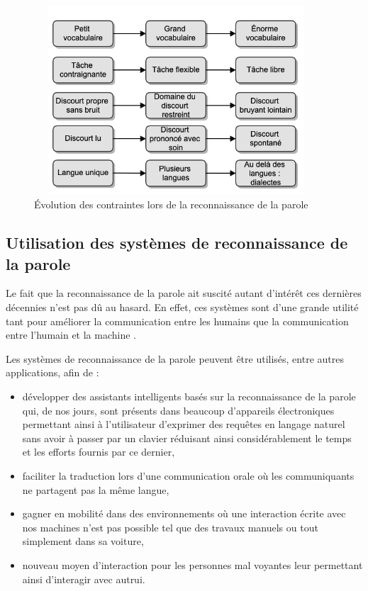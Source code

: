 \begin{figure}[H]
    \centering
    \includegraphics[height=200pt,width=300pt]{images/chap1/evolution_asr.png}
    \caption{Évolution des contraintes lors de la reconnaissance de la parole}
    \label{evolotion}
\end{figure}

\subsection{Utilisation des systèmes de reconnaissance de la parole}
Le fait que la reconnaissance de la parole ait suscité autant d'intérêt ces dernières décennies n'est pas dû au hasard. En effet, ces systèmes sont d'une grande utilité tant pour améliorer la communication entre les humains que la communication entre l'humain et la machine \cite{deeplearningapproach}.

Les systèmes de reconnaissance de la parole peuvent être utilisés, entre autres applications, afin de : 
\begin{itemize}
    \item développer des assistants intelligents basés sur la reconnaissance de la parole qui, de nos jours, sont présents dans beaucoup d'appareils électroniques permettant ainsi à l'utilisateur d'exprimer des requêtes en langage naturel sans avoir à passer par un clavier réduisant ainsi considérablement le temps et les efforts fournis par ce dernier,
    \item faciliter la traduction lors d'une communication orale où les communiquants ne partagent pas la même langue,
     \item gagner en mobilité dans des environnements où une interaction écrite avec nos machines n'est pas possible tel que des travaux manuels ou tout simplement dans sa voiture,
    \item nouveau moyen d'interaction pour les personnes mal voyantes leur permettant ainsi d'interagir avec autrui.
\end{itemize}

